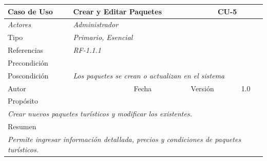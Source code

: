 \begin{table}[H]
\begin{tabular}{|llllllll|}
\hline
\multicolumn{1}{|l|}{\cellcolor[HTML]{F2F2F2}Caso de Uso} & \multicolumn{5}{l|}{Crear y Editar Paquetes} & \multicolumn{2}{l|}{\cellcolor[HTML]{E6E6E6}CU-5} \\ \hline
\multicolumn{1}{|l|}{{\color[HTML]{808080} \textit{Actores}}} & \multicolumn{7}{l|}{{\color[HTML]{808080} \textit{Administrador}}} \\ \hline
\multicolumn{1}{|l|}{Tipo} & \multicolumn{7}{l|}{{\color[HTML]{808080} \textit{Primario, Esencial}}} \\ \hline
\multicolumn{1}{|l|}{Referencias} & \multicolumn{2}{l|}{{\color[HTML]{808080} \textit{RF-1.1.1}}} & \multicolumn{5}{l|}{} \\ \hline
\multicolumn{1}{|l|}{Precondición} & \multicolumn{7}{l|}{} \\ \hline
\multicolumn{1}{|l|}{Poscondición} & \multicolumn{7}{l|}{{\color[HTML]{808080} \textit{Los paquetes se crean o actualizan en el sistema}}} \\ \hline
\multicolumn{1}{|l|}{Autor} & \multicolumn{1}{l|}{} & \multicolumn{2}{l|}{Fecha} & \multicolumn{1}{l|}{} & \multicolumn{2}{l|}{Versión} & 1.0 \\ \hline
\multicolumn{8}{|l|}{Propósito} \\ \hline
\multicolumn{8}{|p{15cm}|}{{\color[HTML]{808080} \textit{Crear nuevos paquetes turísticos y modificar los existentes.}}} \\ \hline
\multicolumn{8}{|l|}{Resumen} \\ \hline
\multicolumn{8}{|p{15cm}|}{{\color[HTML]{808080} \textit{Permite ingresar información detallada, precios y condiciones de paquetes turísticos.}}} \\ \hline
\end{tabular}
\end{table}

